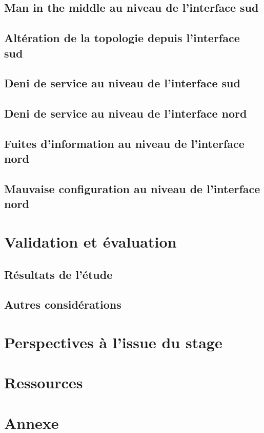 \documentclass[11pt]{article}
\begin{document}
	\subsection{Man in the middle au niveau de l'interface sud}
		
		\newpage
	\subsection{Altération de la topologie depuis l'interface sud}
		
		\newpage
	\subsection{Deni de service au niveau de l'interface sud}
		
	\subsection{Deni de service au niveau de l'interface nord}
	\subsection{Fuites d'information au niveau de l'interface nord}
	\subsection{Mauvaise configuration au niveau de l'interface nord}
\section{Validation et évaluation}
	\subsection{Résultats de l'étude}
	\subsection{Autres considérations}
\section{Perspectives à l'issue du stage}
\section{Ressources}
\newpage
{}
\section{Annexe}
	


~

\newpage


\end{document}
